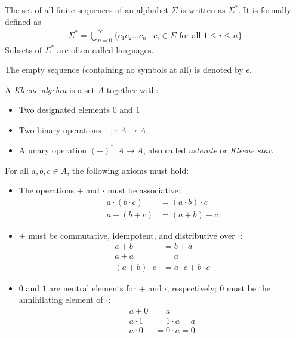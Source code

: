 \begin{definition}
    The set of all finite sequences of an alphabet $\Sigma$ is written as $\Sigma^\ast$.
    It is formally defined as
    \begin{align}
        \Sigma^\ast = \bigcup\limits_{n=0}^\infty \{c_1 c_2 \ldots c_n \mid c_i \in \Sigma \text{ for all } 1 \le i \le n \}
    \end{align}
    Subsets of $\Sigma^\ast$ are often called languages.
\end{definition}

The empty sequence (containing no symbols at all) is denoted by $\epsilon$.

\begin{definition}
    A \textit{Kleene algebra} is a set $A$ together with:
    \begin{itemize}
        \item Two designated elements $0$ and $1$
        \item Two binary operations $+, \cdot : A \rightarrow A$.
        \item A unary operation $(-)^\ast : A \rightarrow A$, also called \textit{asterate} or \textit{Kleene star}.
    \end{itemize}

    For all $a, b, c \in A$, the following axioms must hold:

    \begin{itemize}
        \item The operations $+$ and $\cdot$ must be associative:
            \begin{align}
                a \cdot (b \cdot c) &= (a \cdot b) \cdot c\\
                a + (b + c) &= (a + b) + c
            \end{align}

        \item $+$ must be commutative, idempotent, and distributive over $\cdot$:
            \begin{align}
                a + b &= b + a\\
                a + a &= a\\
                (a + b) \cdot c &= a \cdot c + b \cdot c
            \end{align}

        \item $0$ and $1$ are neutral elements for $+$ and $\cdot$, respectively;
            $0$ must be the annihilating element of $\cdot$:
            \begin{align}
                a + 0 &= a\\
                a \cdot 1 &= 1 \cdot a = a\\
                a \cdot 0 &= 0 \cdot a = 0
            \end{align}


\end{itemize}
\end{definition}
